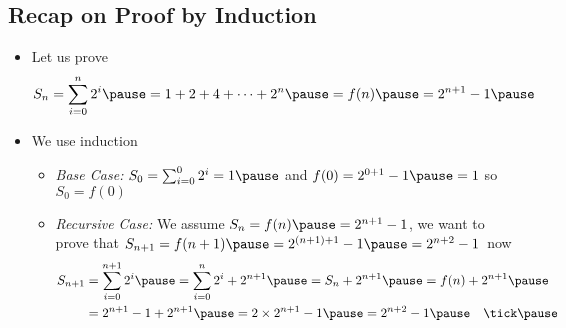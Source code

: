 
\begin{slide} 
\section[-2]{Recap on Proof by Induction}

\pausebuild
\begin{itemize}\squeeze
\item Let us prove
  \begin{align*}
    S_n = \sum_{i=0}^n 2^i\pause = 1 + 2 + 4 +\cdots + 2^n\pause = f(n)\pause =
    2^{n+1}-1 \pause
  \end{align*}
\item We use induction\pause
  \begin{itemize}
  \item \emph{Base Case:} $S_0 = \sum_{i=0}^0 2^i = 1\pause$ and $f(0)
  = 2^{0+1} -1\pause=1$ \pause so $S_0 = f(0)$\pause\tick\pause 
  \item \emph{Recursive Case:} We assume $S_n = f(n)\pause = 2^{n+1}
    -1$\pause, we want to prove that $S_{n+1} = f(n+1)\pause =
    2^{(n+1)+1} -1\pause= 2^{n+2}-1$\pause\ now 
    \begin{align*}
      S_{n+1} &= \sum_{i=0}^{n+1} 2^i\pause = \sum_{i=0}^n 2^i +
      2^{n+1}\pause = S_n + 2^{n+1}\pause = f(n) + 2^{n+1}\pause\\ &= 2^{n+1} -1 +
      2^{n+1}\pause = 2\times2^{n+1} -1\pause = 2^{n+2} -1 \pause
      \hspace{1em} \mbox{\tick}\pause 
    \end{align*}
  \end{itemize}
\end{itemize}

\end{slide}


\Outline

